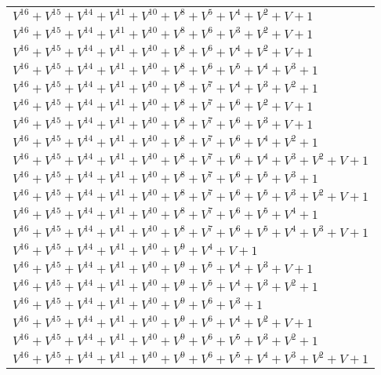 \documentclass[12pt]{article}
\begin{document}
\begin{adjustwidth}{-4cm}{}
\begin{center}
\begin{longtable}{|l|}
$V^{16}  +V^{15}  +V^{14}  +V^{11}  +V^{10}  +V^{8}  +V^{5}  +V^{4}  +V^{2}  + V + 1$ \\
$V^{16}  +V^{15}  +V^{14}  +V^{11}  +V^{10}  +V^{8}  +V^{6}  +V^{3}  +V^{2}  + V + 1$ \\
$V^{16}  +V^{15}  +V^{14}  +V^{11}  +V^{10}  +V^{8}  +V^{6}  +V^{4}  +V^{2}  + V + 1$ \\
$V^{16}  +V^{15}  +V^{14}  +V^{11}  +V^{10}  +V^{8}  +V^{6}  +V^{5}  +V^{4}  +V^{3}  + 1$ \\
$V^{16}  +V^{15}  +V^{14}  +V^{11}  +V^{10}  +V^{8}  +V^{7}  +V^{4}  +V^{3}  +V^{2}  + 1$ \\
$V^{16}  +V^{15}  +V^{14}  +V^{11}  +V^{10}  +V^{8}  +V^{7}  +V^{6}  +V^{2}  + V + 1$ \\
$V^{16}  +V^{15}  +V^{14}  +V^{11}  +V^{10}  +V^{8}  +V^{7}  +V^{6}  +V^{3}  + V + 1$ \\
$V^{16}  +V^{15}  +V^{14}  +V^{11}  +V^{10}  +V^{8}  +V^{7}  +V^{6}  +V^{4}  +V^{2}  + 1$ \\
$V^{16}  +V^{15}  +V^{14}  +V^{11}  +V^{10}  +V^{8}  +V^{7}  +V^{6}  +V^{4}  +V^{3}  +V^{2}  + V + 1$ \\
$V^{16}  +V^{15}  +V^{14}  +V^{11}  +V^{10}  +V^{8}  +V^{7}  +V^{6}  +V^{5}  +V^{3}  + 1$ \\
$V^{16}  +V^{15}  +V^{14}  +V^{11}  +V^{10}  +V^{8}  +V^{7}  +V^{6}  +V^{5}  +V^{3}  +V^{2}  + V + 1$ \\
$V^{16}  +V^{15}  +V^{14}  +V^{11}  +V^{10}  +V^{8}  +V^{7}  +V^{6}  +V^{5}  +V^{4}  + 1$ \\
$V^{16}  +V^{15}  +V^{14}  +V^{11}  +V^{10}  +V^{8}  +V^{7}  +V^{6}  +V^{5}  +V^{4}  +V^{3}  + V + 1$ \\
$V^{16}  +V^{15}  +V^{14}  +V^{11}  +V^{10}  +V^{9}  +V^{4}  + V + 1$ \\
$V^{16}  +V^{15}  +V^{14}  +V^{11}  +V^{10}  +V^{9}  +V^{5}  +V^{4}  +V^{3}  + V + 1$ \\
$V^{16}  +V^{15}  +V^{14}  +V^{11}  +V^{10}  +V^{9}  +V^{5}  +V^{4}  +V^{3}  +V^{2}  + 1$ \\
$V^{16}  +V^{15}  +V^{14}  +V^{11}  +V^{10}  +V^{9}  +V^{6}  +V^{3}  + 1$ \\
$V^{16}  +V^{15}  +V^{14}  +V^{11}  +V^{10}  +V^{9}  +V^{6}  +V^{4}  +V^{2}  + V + 1$ \\
$V^{16}  +V^{15}  +V^{14}  +V^{11}  +V^{10}  +V^{9}  +V^{6}  +V^{5}  +V^{3}  +V^{2}  + 1$ \\
$V^{16}  +V^{15}  +V^{14}  +V^{11}  +V^{10}  +V^{9}  +V^{6}  +V^{5}  +V^{4}  +V^{3}  +V^{2}  + V + 1$ \\

\end{longtable}
\end{center}
\end{adjustwidth}
\end{document}

